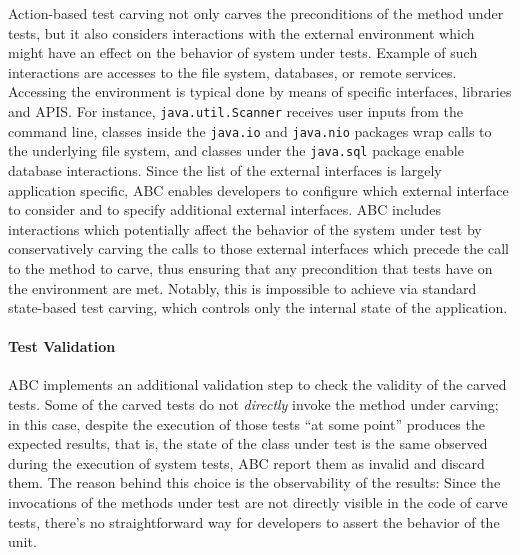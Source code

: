 \documentclass[10pt,conference]{IEEEtran}
\newcommand{\abc}{\textsf{ABC}\xspace}
\begin{document}
Action-based test carving not only carves the preconditions of the method under tests, but it also considers interactions with the external environment which might have an effect on the behavior of system under tests. Example of such interactions are accesses to the file system, databases, or remote services. Accessing the environment is typical done by means of specific interfaces, libraries and APIS. For instance, \texttt{java.util.Scanner} receives user inputs from the command line, classes inside the \texttt{java.io} and \texttt{java.nio} packages wrap calls to the underlying file system, and classes under the \texttt{java.sql} package enable database interactions. Since the list of the external interfaces is largely application specific, \abc enables developers to configure which external interface to consider and to specify additional external interfaces.
\abc includes interactions which potentially affect the behavior of the system under test by conservatively carving the calls to those  external interfaces which precede the call to the method to carve, thus ensuring that any precondition that tests have on the environment are met. Notably, this is impossible to achieve via standard state-based test carving, which controls only
the internal state of the application.

\paragraph{Test Validation}
\abc implements an additional validation step to check the validity of the carved tests. 
%
Some of the carved tests do not \emph{directly} invoke the method under carving; in this case,
despite the execution of those tests ``at some point'' produces the expected results, that is, the state of the class under test is the same observed during the execution of system tests, \abc report them as invalid and discard them.
%
The reason behind this choice is the observability of the results: Since the invocations 
 of the methods under test are not directly visible in the code of carve tests, there's no straightforward way
for developers to assert the behavior of the unit.
\end{document}
